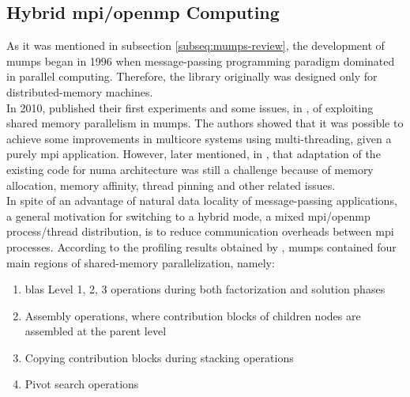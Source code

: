 \subsection{Hybrid \acrshort{mpi}/\acrshort{openmp} Computing}

\label{subseq:mpi-openmp}


As it was mentioned in subsection \ref{subseq:mumps-review}, the development of \acrshort{mumps} began in 1996 when message-passing programming paradigm dominated in parallel computing. Therefore, the library originally was designed only for distributed-memory machines.\\

In 2010,  \citeauthor{chowdhury2010some} published their first experiments and some issues, in \cite{chowdhury2010some}, of exploiting shared memory parallelism in \acrshort{mumps}. The authors showed that it was possible to achieve some improvements in multicore systems using multi-threading, given a purely \acrshort{mpi} application. However, later \citeauthor{l2013introduction} mentioned, in \cite{l2013introduction}, that adaptation of the existing code for \acrshort{numa} architecture was still a challenge because of memory allocation, memory affinity, thread pinning and other related issues.\\


In spite of an advantage of natural data locality of message-passing applications, a general motivation for switching to a hybrid mode, a mixed \acrshort{mpi}/\acrshort{openmp} process/thread distribution, is to reduce communication overheads between \acrshort{mpi} processes. According to the profiling results obtained by \citeauthor{chowdhury2010some}, \acrshort{mumps} contained four main regions of shared-memory parallelization, namely: 

\begin{enumerate}

	\item \acrshort{blas} Level 1, 2, 3 operations during both factorization and solution phases \label{openmp-blocks-1}
	
	\item Assembly operations, where contribution blocks of children nodes are assembled at the parent level \label{openmp-blocks-2}
	
	\item Copying contribution blocks during stacking operations \label{openmp-blocks-3}
	
	\item Pivot search operations \label{openmp-blocks-4}

\end{enumerate}


